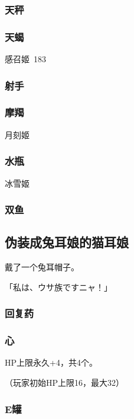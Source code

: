 \documentclass{article}
\begin{document}
\subsubsection{天秤}
\label{costume_bunny}



\subsubsection{天蝎}
\label{costume_bathtowel}

感召姬\ 183


\subsubsection{射手}
\label{costume_gundam}



\subsubsection{摩羯}

月刻姬

\subsubsection{水瓶}

冰雪姬

\subsubsection{双鱼}

\subsection{伪装成兔耳娘的猫耳娘}

戴了一个兔耳帽子。

「私は、ウサ族ですニャ！」

\subsubsection{回复药}

\subsubsection{心}

HP上限永久+4，共4个。

（玩家初始HP上限16，最大32）

\subsubsection{E罐}
\end{document}
